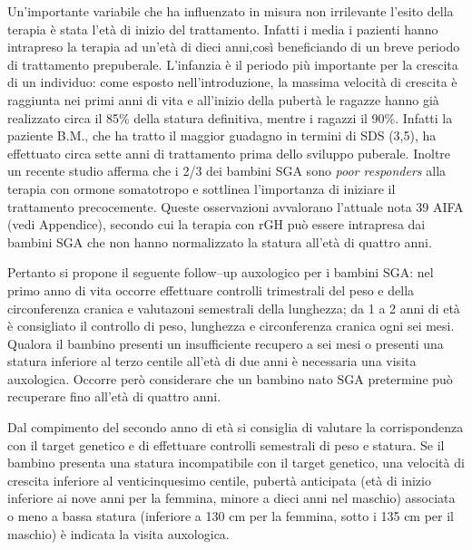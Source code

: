 Un'importante variabile che ha influenzato in misura non irrilevante l'esito della terapia è stata l'età di inizio del trattamento. Infatti i media i pazienti hanno intrapreso la terapia ad un'età di dieci anni,così beneficiando di un breve periodo di trattamento prepuberale. L'infanzia è il periodo più importante per la crescita di un individuo: come esposto nell'introduzione, la massima velocità di crescita è raggiunta nei primi anni di vita e all'inizio della pubertà le ragazze hanno già realizzato circa il 85\% della statura definitiva, mentre i ragazzi il 90\%. Infatti la paziente B.M., che ha tratto il maggior guadagno in termini di SDS (3,5), ha effettuato circa sette anni di trattamento prima dello sviluppo puberale. Inoltre un recente studio afferma che i 2/3 dei bambini SGA sono \textit{poor responders} alla terapia con ormone somatotropo e sottlinea l'importanza di iniziare il trattamento precocemente.%
Queste osservazioni avvalorano l'attuale nota 39 AIFA (vedi Appendice), secondo cui la terapia con rGH può essere intrapresa dai bambini SGA che non hanno normalizzato la statura all'età di quattro anni.

Pertanto si propone il seguente follow--up auxologico per i bambini SGA: nel primo anno di vita occorre effettuare controlli trimestrali del peso e della circonferenza cranica e valutazoni semestrali della lunghezza; da 1 a 2 anni di età è consigliato il controllo di peso, lunghezza e circonferenza cranica ogni sei mesi. Qualora il bambino presenti un insufficiente recupero a sei mesi o presenti una statura inferiore al terzo centile all'età di due anni è necessaria una visita auxologica. Occorre però considerare che un bambino nato SGA pretermine può recuperare fino all'età di quattro anni. 

Dal compimento del secondo anno di età si consiglia di valutare la corrispondenza con il target genetico e di effettuare controlli semestrali di peso e statura. Se il bambino presenta una statura incompatibile con il target genetico, una velocità di crescita inferiore al venticinquesimo centile, pubertà anticipata (età di inizio inferiore ai nove anni per la femmina, minore a dieci anni nel maschio) associata o meno a bassa statura (inferiore a 130 cm per la femmina, sotto i 135 cm per il maschio) è indicata la visita auxologica.

  